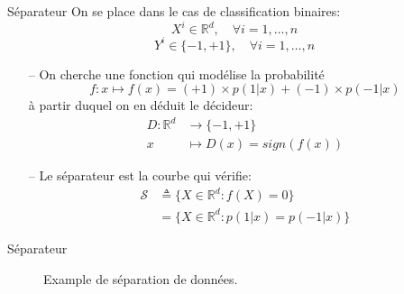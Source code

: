 \documentclass[9pt]{beamer}
\begin{document}
	\begin{frame}{Séparateur}
		On se place dans le cas de classification binaires:
		$$ X^i \in \mathbb{R}^d , \quad \forall i=1,\dots,n$$
		$$ Y^i \in \{-1, +1\} , \quad \forall i=1,\dots,n$$
		\begin{itemize}
			\item[--]On cherche une fonction qui modélise la probabilité
			$$f: x \mapsto f(x) = (+1) \times p(1\vert x) + (-1) \times p(-1\vert x)$$
			à partir duquel on en déduit le décideur:
			\begin{align*}
				D: \mathbb{R}^d &\rightarrow \{-1, +1\} \\
				x &\mapsto D(x) = sign(f(x))
			\end{align*}
			\item[--] Le séparateur est la courbe qui vérifie:
			\begin{align*}
				\mathscr{S} &\triangleq \{X \in \mathbb{R}^d: f(X) = 0\} \\
							&= \{X \in \mathbb{R}^d: p(1\vert x) = p(-1\vert x)\}
			\end{align*}
		\end{itemize}
	\end{frame}

	\begin{frame}{Séparateur}
		\begin{figure}[H]
			{
				\caption{\label{fig::separators} Example de séparation de données.}
			}
		\end{figure}
	\end{frame}
\end{document}
